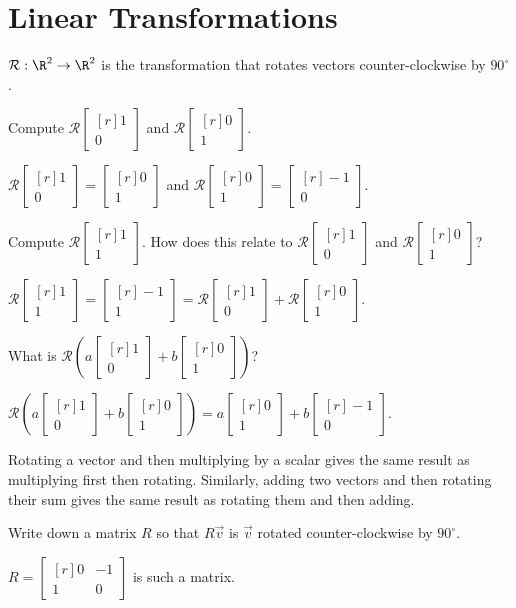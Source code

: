 \documentclass{problemset}
\newcommand{\mat}[1]{\begin{bmatrix*}[r]#1\end{bmatrix*}}
\begin{document}
	\newpage
\pagestyle{siefken}
\section*{Linear Transformations}
\vspace{-1.5em}
	
	\question
	$\mathcal R:\R^2\to\R^2$ is the transformation that rotates vectors counter-clockwise 
	by $90^\circ$.
	\begin{parts}
		\item Compute $\mathcal R\mat{1\\0}$ and $\mathcal R\mat{0\\1}$.
			\begin{solution}[inline]
				$\mathcal R\mat{1\\0}=\mat{0\\1}$ and
				$\mathcal R\mat{0\\1}=\mat{-1\\0}$.
			\end{solution}
		\item Compute $\mathcal R\mat{1\\1}$. How does this relate to
			$\mathcal R\mat{1\\0}$ and $\mathcal R\mat{0\\1}$?
			\begin{solution}
				$\mathcal R\mat{1\\1}=\mat{-1\\1}=\mathcal R\mat{1\\0}+\mathcal R\mat{0\\1}$.
			\end{solution}
		\item What is $\mathcal R\left(a\mat{1\\0}+b\mat{0\\1}\right)$?
			\begin{solution}
				$\mathcal R\left(a\mat{1\\0}+b\mat{0\\1}\right)=a\mat{0\\1}+b\mat{-1\\0}$.

				Rotating a vector and then multiplying by a scalar gives the same
				result as multiplying first then rotating. Similarly, adding two
				vectors and then rotating their sum gives the same result as rotating
				them and then adding.
			\end{solution}
		\item Write down a matrix $R$ so that $R\vec v$ is $\vec v$ rotated
			counter-clockwise by $90^\circ$.
			\begin{solution}
				$R = \mat{0&-1\\1&0}$ is such a matrix. 
			\end{solution}
	\end{parts}
\end{document}
